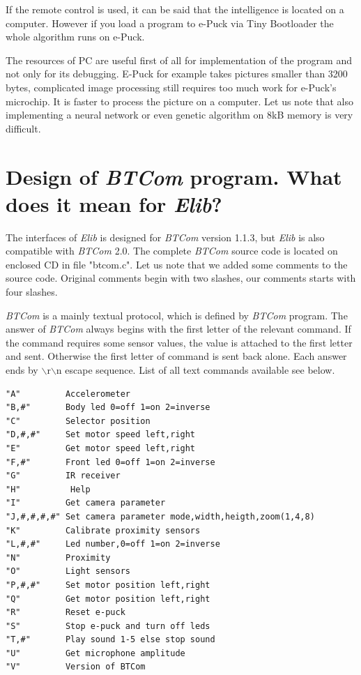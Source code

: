   If the remote control is used, it can be said that the intelligence 
  is located on a computer. However if you load a program to e-Puck via Tiny Bootloader the whole algorithm
  runs on e-Puck.
   
  The resources of PC are useful first of all for implementation of the program and not only for
  its debugging. E-Puck for example takes pictures smaller than 3200 bytes, complicated image processing still
  requires too much work for e-Puck's microchip. It is faster to process the picture
  on a computer. Let us note that also implementing a neural network or even genetic algorithm on 8kB memory
  is very difficult.
\section{Design of {\it BTCom} program. What does it mean for {\it Elib}?}
  \label{sec:btcomdesign}
  The interfaces of {\it Elib} is designed for {\it BTCom} version 1.1.3, but {\it Elib} is also compatible with {\it BTCom} 2.0.
  The complete {\it BTCom} source code is located on enclosed CD in file "btcom.c".
  Let us note that we added some comments to the source code. Original comments begin with two slashes,
  our comments starts with four slashes.

  {\it BTCom} is a mainly textual protocol, which is defined by {\it BTCom} program. The answer of {\it BTCom} always begins 
  with the first letter of the relevant command.
  If the command requires some sensor values, the value is attached to the first letter and
  sent. Otherwise the first letter of command is sent back alone. Each answer ends by 
  $\backslash$r$\backslash$n escape sequence.
  List of all text commands available see below.
  \lstset{basicstyle=\small}
\begin{lstlisting}
"A"         Accelerometer
"B,#"       Body led 0=off 1=on 2=inverse
"C"         Selector position
"D,#,#"     Set motor speed left,right
"E"         Get motor speed left,right
"F,#"       Front led 0=off 1=on 2=inverse
"G"         IR receiver
"H"          Help
"I"         Get camera parameter
"J,#,#,#,#" Set camera parameter mode,width,heigth,zoom(1,4,8)
"K"         Calibrate proximity sensors
"L,#,#"     Led number,0=off 1=on 2=inverse
"N"         Proximity
"O"         Light sensors
"P,#,#"     Set motor position left,right
"Q"         Get motor position left,right
"R"         Reset e-puck
"S"         Stop e-puck and turn off leds
"T,#"       Play sound 1-5 else stop sound
"U"         Get microphone amplitude
"V"         Version of BTCom
\end{lstlisting}
    
